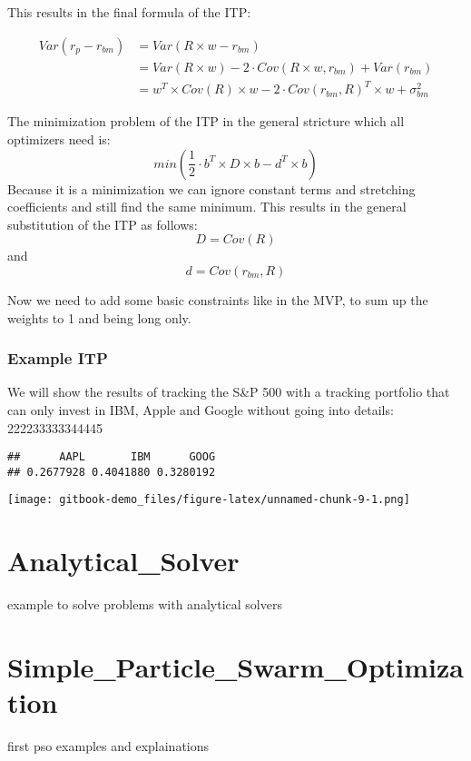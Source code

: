 \documentclass[
  oneside]{book}
\begin{document}
This results in the final formula of the ITP:

\begin{equation}
  \begin{split}
   Var(r_{p}-r_{bm}) & = Var(R \times w - r_{bm}) \\
   & = Var(R \times w) - 2 \cdot Cov(R \times w,r_{bm}) + Var(r_{bm})  \\
   & = w^T \times Cov(R) \times w - 2 \cdot Cov(r_{bm}, R)^T \times w + \sigma_{bm}^2
   \end{split}
   \label{eq:ITP}
\end{equation}

The minimization problem of the ITP in the general stricture which all optimizers need is:
\[
  min(\frac{1}{2} \cdot b^T \times D \times b -d^T \times b)
\]
Because it is a minimization we can ignore constant terms and stretching coefficients and still find the same minimum. This results in the general substitution of the ITP as follows:
\[
  D = Cov(R)
\]
and
\[
d = Cov(r_{bm}, R)
\]

Now we need to add some basic constraints like in the MVP, to sum up the weights to 1 and being long only.

\hypertarget{example-itp}{%
\subsection{Example ITP}\label{example-itp}}

We will show the results of tracking the S\&P 500 with a tracking portfolio that can only invest in IBM, Apple and Google without going into details:
222233333344445

\begin{verbatim}
##      AAPL       IBM      GOOG 
## 0.2677928 0.4041880 0.3280192
\end{verbatim}

\texttt{[image: gitbook-demo\_files/figure-latex/unnamed-chunk-9-1.png]}

\hypertarget{analytical_solver}{%
\chapter{Analytical\_Solver}\label{analytical_solver}}

example to solve problems with analytical solvers

\hypertarget{simple_particle_swarm_optimization}{%
\chapter{Simple\_Particle\_Swarm\_Optimization}\label{simple_particle_swarm_optimization}}

first pso examples and explainations

  
\end{document}
